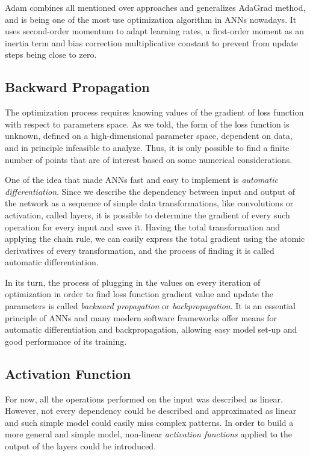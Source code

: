Adam combines all mentioned over approaches and generalizes AdaGrad method, and is being one of the most use optimization algorithm in ANNs nowadays.
It uses second-order momentum to adapt learning rates, a first-order moment as an inertia term and bias correction multiplicative constant to prevent from update steps being close to zero.

\subsection{Backward Propagation}

The optimization process requires knowing values of the gradient of loss function with respect to parameters space.
As we told, the form of the loss function is unknown, defined on a high-dimensional parameter space, dependent on data, and in principle infeasible to analyze.
Thus, it is only possible to find a finite number of points that are of interest based on some numerical considerations.

\medskip
One of the idea that made ANNs fast and easy to implement is \emph{automatic differentiation}.
Since we describe the dependency between input and output of the network as a sequence of simple data transformations, like convolutions or activation, called layers, it is possible to determine the gradient of every such operation for every input and save it.
Having the total transformation and applying the chain rule, we can easily express the total gradient using the atomic derivatives of every transformation, and the process of finding it is called automatic differentiation. 

\medskip
In its turn, the process of plugging in the values on every iteration of optimization in order to find loss function gradient value and update the parameters is called \textit{backward propagation} or \emph{backpropagation}.
It is an essential principle of ANNs and many modern software frameworks offer means for automatic differentiation and backpropagation, allowing easy model set-up and good performance of its training\cite{}.


\subsection{Activation Function}

For now, all the operations performed on the input was described as linear.
However, not every dependency could be described and approximated as linear and such simple model could easily miss complex patterns.
In order to build a more general and simple model, non-linear \emph{activation functions} applied to the output of the layers could be introduced.
\medskip

